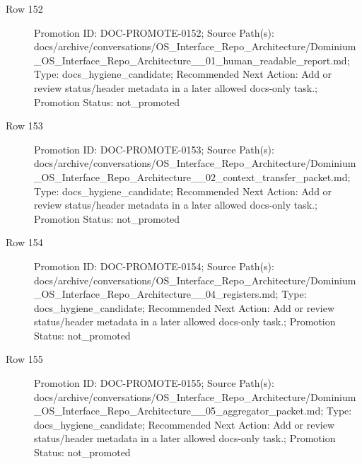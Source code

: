 \documentclass[9pt,a4paper,openany]{book}
\begin{document}
\begin{description}
\item[Row 152] Promotion ID: DOC-\allowbreak{}PROMOTE-\allowbreak{}0152; Source Path(s): docs/\allowbreak{}archive/\allowbreak{}conversations/\allowbreak{}OS\_\allowbreak{}Interface\_\allowbreak{}Repo\_\allowbreak{}Architecture/\allowbreak{}Dominium\_\allowbreak{}OS\_\allowbreak{}Interface\_\allowbreak{}Repo\_\allowbreak{}Architecture\_\allowbreak{}\_\allowbreak{}01\_\allowbreak{}human\_\allowbreak{}readable\_\allowbreak{}report.\allowbreak{}md; Type: docs\_\allowbreak{}hygiene\_\allowbreak{}candidate; Recommended Next Action: Add or review status/\allowbreak{}header metadata in a later allowed docs-\allowbreak{}only task.\allowbreak{}; Promotion Status: not\_\allowbreak{}promoted
\item[Row 153] Promotion ID: DOC-\allowbreak{}PROMOTE-\allowbreak{}0153; Source Path(s): docs/\allowbreak{}archive/\allowbreak{}conversations/\allowbreak{}OS\_\allowbreak{}Interface\_\allowbreak{}Repo\_\allowbreak{}Architecture/\allowbreak{}Dominium\_\allowbreak{}OS\_\allowbreak{}Interface\_\allowbreak{}Repo\_\allowbreak{}Architecture\_\allowbreak{}\_\allowbreak{}02\_\allowbreak{}context\_\allowbreak{}transfer\_\allowbreak{}packet.\allowbreak{}md; Type: docs\_\allowbreak{}hygiene\_\allowbreak{}candidate; Recommended Next Action: Add or review status/\allowbreak{}header metadata in a later allowed docs-\allowbreak{}only task.\allowbreak{}; Promotion Status: not\_\allowbreak{}promoted
\item[Row 154] Promotion ID: DOC-\allowbreak{}PROMOTE-\allowbreak{}0154; Source Path(s): docs/\allowbreak{}archive/\allowbreak{}conversations/\allowbreak{}OS\_\allowbreak{}Interface\_\allowbreak{}Repo\_\allowbreak{}Architecture/\allowbreak{}Dominium\_\allowbreak{}OS\_\allowbreak{}Interface\_\allowbreak{}Repo\_\allowbreak{}Architecture\_\allowbreak{}\_\allowbreak{}04\_\allowbreak{}registers.\allowbreak{}md; Type: docs\_\allowbreak{}hygiene\_\allowbreak{}candidate; Recommended Next Action: Add or review status/\allowbreak{}header metadata in a later allowed docs-\allowbreak{}only task.\allowbreak{}; Promotion Status: not\_\allowbreak{}promoted
\item[Row 155] Promotion ID: DOC-\allowbreak{}PROMOTE-\allowbreak{}0155; Source Path(s): docs/\allowbreak{}archive/\allowbreak{}conversations/\allowbreak{}OS\_\allowbreak{}Interface\_\allowbreak{}Repo\_\allowbreak{}Architecture/\allowbreak{}Dominium\_\allowbreak{}OS\_\allowbreak{}Interface\_\allowbreak{}Repo\_\allowbreak{}Architecture\_\allowbreak{}\_\allowbreak{}05\_\allowbreak{}aggregator\_\allowbreak{}packet.\allowbreak{}md; Type: docs\_\allowbreak{}hygiene\_\allowbreak{}candidate; Recommended Next Action: Add or review status/\allowbreak{}header metadata in a later allowed docs-\allowbreak{}only task.\allowbreak{}; Promotion Status: not\_\allowbreak{}promoted

\end{description}
\end{document}
